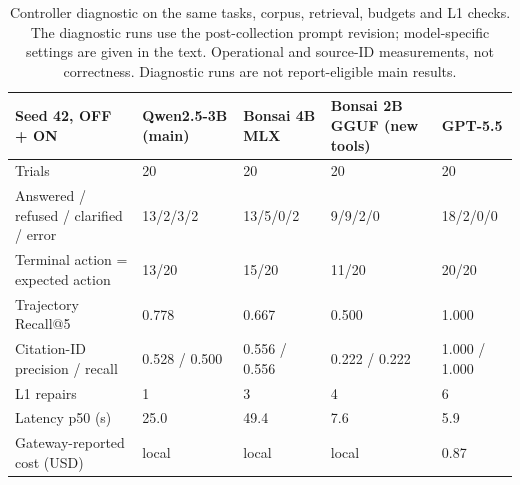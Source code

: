 \begin{table}[H]\centering\footnotesize
\begin{tabularx}{\textwidth}{@{}L{5.2cm}XXXX@{}}\toprule
Seed 42, OFF + ON & Qwen2.5-3B (main) & Bonsai 4B MLX & Bonsai 2B GGUF (new tools) & GPT-5.5\\\midrule
Trials & 20 & 20 & 20 & 20\\
Answered / refused / clarified / error & 13/2/3/2 & 13/5/0/2 & 9/9/2/0 & 18/2/0/0\\
Terminal action = expected action & 13/20 & 15/20 & 11/20 & 20/20\\
Trajectory Recall@5 & 0.778 & 0.667 & 0.500 & 1.000\\
Citation-ID precision / recall & 0.528 / 0.500 & 0.556 / 0.556 & 0.222 / 0.222 & 1.000 / 1.000\\
L1 repairs & 1 & 3 & 4 & 6\\
Latency p50 (s) & 25.0 & 49.4 & 7.6 & 5.9\\
Gateway-reported cost (USD) & local & local & local & 0.87\\
\bottomrule\end{tabularx}
\caption{Controller diagnostic on the same tasks, corpus, retrieval, budgets and L1 checks. The diagnostic runs use the post-collection prompt revision; model-specific settings are given in the text. Operational and source-ID measurements, not correctness. Diagnostic runs are not report-eligible main results.}\label{tab:diag}
\end{table}
